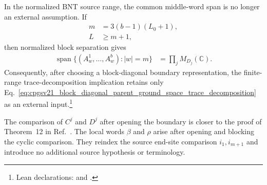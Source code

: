 \documentclass{article}
\begin{document}
In the normalized BNT source range, the common middle-word span is no longer an
external assumption. If
\begin{align}
  m
    &=
    3(b-1)(L_0+1),
  \label{eq:cpgsv21_block_diagonal_parent_ground_space_middle_length}\\
  L
    &\geq
    m+1,
  \label{eq:cpgsv21_block_diagonal_parent_ground_space_middle_local_bound}
\end{align}
then normalized block separation gives
\begin{align}
  \operatorname{span}
  \{(A^1_w,\ldots,A^b_w):|w|=m\}
    &=
    \prod_jM_{D_j}(\mathbb C).
  \label{eq:cpgsv21_block_diagonal_parent_ground_space_middle_product_span}
\end{align}
Consequently, after choosing a block-diagonal boundary representation, the
finite-range trace-decomposition implication retains only
Eq.~\ref{eq:cpgsv21_block_diagonal_parent_ground_space_trace_decomposition} as
an external input.\footnote{Lean declarations:
and
.}

The comparison of $C^j$ and $D^j$ after opening the boundary is closer to the
proof of Theorem~12 in Ref.~\cite{PerezGarcia2007MPSReps}. The local words
$\beta$ and $\rho$ arise after opening and blocking the cyclic comparison.
They reindex the source end-site comparison $i_1,i_{m+1}$ and introduce no
additional source hypothesis or terminology.
\end{document}
